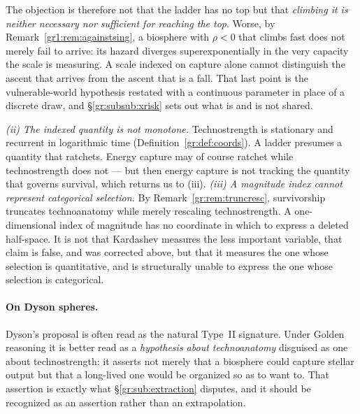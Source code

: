 \documentclass[11pt]{article}
\numberwithin{equation}{section}
\theoremstyle{plain}
\theoremstyle{definition}
\theoremstyle{remark}
\begin{document}
The objection is therefore not that the ladder has no top but that
\emph{climbing it is neither necessary nor sufficient for reaching the
top}. Worse, by Remark~\ref{gr1:rem:againstsing}, a biosphere with
$\rho<0$ that climbs fast does not merely fail to arrive: its hazard
diverges superexponentially in the very capacity the scale is
measuring. A scale indexed on capture alone cannot distinguish the
ascent that arrives from the ascent that is a fall. That last point is
the vulnerable-world hypothesis \cite{Bostrom19} restated with a
continuous parameter in place of a discrete draw, and
\S\ref{gr:subsub:xrisk} sets out what is and is not shared.

\emph{(ii) The indexed quantity is not monotone.} Technostrength is
stationary and recurrent in logarithmic time
(Definition~\ref{gr:def:coords}). A ladder presumes a quantity that
ratchets. Energy capture may of course ratchet while technostrength does
not --- but then energy capture is not tracking the quantity that
governs survival, which returns us to (iii). \emph{(iii) A magnitude index cannot represent categorical selection.}
By Remark~\ref{gr:rem:truncresc}, survivorship truncates technoanatomy
while merely rescaling technostrength. A one-dimensional index of
magnitude has no coordinate in which to express a deleted half-space. It
is not that Kardashev measures the less important variable, that
claim is false, and was corrected above, but that it measures the one
whose selection is quantitative, and is structurally unable to express
the one whose selection is categorical.

\paragraph{On Dyson spheres.}\label{gr:rem:dyson}
Dyson's proposal \cite{Dys60} is often read as the natural
Type~II signature. Under Golden reasoning it is better read as a
\emph{hypothesis about technoanatomy} disguised as one about
technostrength: it asserts not merely that a biosphere could capture
stellar output but that a long-lived one would be organized so as to
want to. That assertion is exactly what \S\ref{gr:sub:extraction}
disputes, and it should be recognized as an assertion rather than an
extrapolation.
\end{document}

